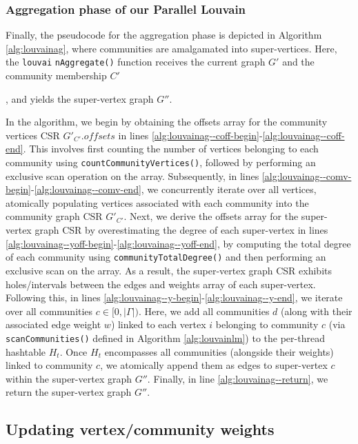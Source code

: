\subsubsection{Aggregation phase of our Parallel Louvain}

Finally, the pseudocode for the aggregation phase is depicted in Algorithm \ref{alg:louvainag}, where communities are amalgamated into super-vertices. Here, the \texttt{louvai} \texttt{nAggregate()} function receives the current graph $G'$ and the community membership $C'$, and yields the super-vertex graph $G''$.



In the algorithm, we begin by obtaining the offsets array for the community vertices CSR $G'_{C'}.offsets$ in lines \ref{alg:louvainag--coff-begin}-\ref{alg:louvainag--coff-end}. This involves first counting the number of vertices belonging to each community using \texttt{countCommunityVertices()}, followed by performing an exclusive scan operation on the array. Subsequently, in lines \ref{alg:louvainag--comv-begin}-\ref{alg:louvainag--comv-end}, we concurrently iterate over all vertices, atomically populating vertices associated with each community into the community graph CSR $G'_{C'}$. Next, we derive the offsets array for the super-vertex graph CSR by overestimating the degree of each super-vertex in lines \ref{alg:louvainag--yoff-begin}-\ref{alg:louvainag--yoff-end}, by computing the total degree of each community using \texttt{communityTotalDegree()} and then performing an exclusive scan on the array. As a result, the super-vertex graph CSR exhibits holes/intervals between the edges and weights array of each super-vertex. Following this, in lines \ref{alg:louvainag--y-begin}-\ref{alg:louvainag--y-end}, we iterate over all communities $c \in [0, |\Gamma|)$. Here, we add all communities $d$ (along with their associated edge weight $w$) linked to each vertex $i$ belonging to community $c$ (via \texttt{scanCommunities()} defined in Algorithm \ref{alg:louvainlm}) to the per-thread hashtable $H_t$. Once $H_t$ encompasses all communities (alongside their weights) linked to community $c$, we atomically append them as edges to super-vertex $c$ within the super-vertex graph $G''$. Finally, in line \ref{alg:louvainag--return}, we return the super-vertex graph $G''$.


\subsection{Updating vertex/community weights}
\label{sec:our-update}

